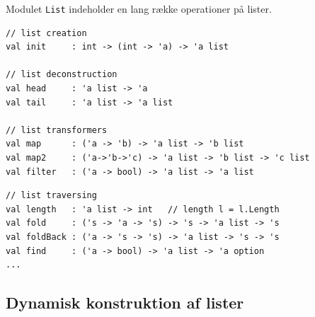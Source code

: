 \documentclass[rgb]{beamer}
\begin{document}
\begin{frame}[fragile]
\begin{footnotesize}


\vspace{1ex}

Modulet \lstinline{List} indeholder en lang række operationer på
lister.

\begin{lstlisting}[numbers=none]
// list creation
val init     : int -> (int -> 'a) -> 'a list

// list deconstruction
val head     : 'a list -> 'a
val tail     : 'a list -> 'a list

// list transformers
val map      : ('a -> 'b) -> 'a list -> 'b list
val map2     : ('a->'b->'c) -> 'a list -> 'b list -> 'c list
val filter   : ('a -> bool) -> 'a list -> 'a list
\end{lstlisting}

\begin{lstlisting}[numbers=none,frame=none]
// list traversing
val length   : 'a list -> int   // length l = l.Length
val fold     : ('s -> 'a -> 's) -> 's -> 'a list -> 's
val foldBack : ('a -> 's -> 's) -> 'a list -> 's -> 's
val find     : ('a -> bool) -> 'a list -> 'a option
...
\end{lstlisting}
\end{footnotesize}

\end{frame}

\subsection{Dynamisk konstruktion af lister}
\end{document}
